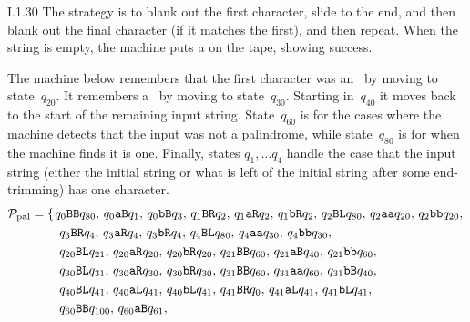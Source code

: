 \begin{ans}{I.1.30}
The strategy is to blank out the first character, slide to the end,
and then blank out the final character (if it matches the first), and then
repeat.
When the string is empty, the machine puts a  on the tape, showing
success.

The machine below remembers that the first character was an~
by moving to state~$q_{20}$.
It remembers a~ by moving to state~$q_{30}$.
Starting in~$q_{40}$ it moves back to the start of the remaining input string.
State~$q_{60}$ is for the cases where the machine detects that the input was
not a palindrome, while state~$q_{80}$ is for when the machine finds it is one.
Finally, states $q_1, \dotso q_4$ handle the case that the input string
(either the initial string or what is left of the initial string after
some end-trimming) has one character.
\begin{align*}
  \TM_{\text{pal}}
  &=
  \{\hspace{\setspacing}
     \tminstruction{0}{B}{B}{80},\,
     \tminstruction{0}{a}{B}{1},\,
     \tminstruction{0}{b}{B}{3},\,
     \tminstruction{1}{B}{R}{2},\,
     \tminstruction{1}{a}{R}{2},\,
     \tminstruction{1}{b}{R}{2},\,
     \tminstruction{2}{B}{L}{80},\,
     \tminstruction{2}{a}{a}{20},\,
     \tminstruction{2}{b}{b}{20},\,
     \\ &\qquad\;
     \tminstruction{3}{B}{R}{4},\,
     \tminstruction{3}{a}{R}{4},\,
     \tminstruction{3}{b}{R}{4},\,
     \tminstruction{4}{B}{L}{80},\,
     \tminstruction{4}{a}{a}{30},\,
     \tminstruction{4}{b}{b}{30},\,
     \\ &\qquad\;
     \tminstruction{20}{B}{L}{21},\,
     \tminstruction{20}{a}{R}{20},\,
     \tminstruction{20}{b}{R}{20},\,
     \tminstruction{21}{B}{B}{60},\,
     \tminstruction{21}{a}{B}{40},\,
     \tminstruction{21}{b}{b}{60},\,
     \\ &\qquad\;
     \tminstruction{30}{B}{L}{31},\,
     \tminstruction{30}{a}{R}{30},\,
     \tminstruction{30}{b}{R}{30},\,
     \tminstruction{31}{B}{B}{60},\,
     \tminstruction{31}{a}{a}{60},\,
     \tminstruction{31}{b}{B}{40},\,
     \\ &\qquad\;
     \tminstruction{40}{B}{L}{41},\,
     \tminstruction{40}{a}{L}{41},\,
     \tminstruction{40}{b}{L}{41},\,
     \tminstruction{41}{B}{R}{0},\,
     \tminstruction{41}{a}{L}{41},\,
     \tminstruction{41}{b}{L}{41},\,
     \\ &\qquad\;
     \tminstruction{60}{B}{B}{100},\,
     \tminstruction{60}{a}{B}{61},\,

\end{align*}
\end{ans}
